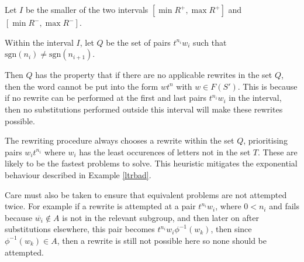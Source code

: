 \documentclass[11pt]{article} %
\theoremstyle{definition}
\theoremstyle{definition}
\theoremstyle{definition}
\newtheorem{lemma}{Lemma}[theorem]
\theoremstyle{definition}
\theoremstyle{definition}
\theoremstyle{definition}
\begin{document}
Let $I$ be the smaller of the two intervals $[\min R^+, \max R^+]$ and
$[\min R^{-}, \max R^-]$.

Within the interval $I$, let $Q$ be the set of pairs $t^{n_i}w_i$ such that
$\text{sgn}(n_i) \ne \text{sgn}(n_{i+1})$.

Then $Q$ has the property that if there are no applicable rewrites
in the set $Q$, then the word cannot be put into the form $wt^n$ with $w \in F(S')$.
This is because if no rewrite can be performed at the first and last pairs $t^{n_i}w_i$
in the interval, then no substitutions performed outside this interval will
make these rewrites possible.

The rewriting procedure always chooses a rewrite within the set $Q$, prioritising
pairs $w_it^{n_i}$ where $w_i$ has the least occurences of letters not in
the set $T$. These are likely to be the fastest problems to solve.
This heuristic mitigates the exponential behaviour described in Example \ref{ltrbad}.

Care must also be taken to ensure that equivalent problems are not attempted twice.
For example if a rewrite is attempted at a pair $t^{n_i}w_i$, where $0 < n_i$
and fails because $\overline{w_i} \notin A$ is not in the relevant subgroup,
and then later on after substitutions elsewhere, this pair becomes
$t^{n_i}w_i\phi^{-1}(w_k)$, then since $\phi^{-1}(w_k) \in A$, then a rewrite
is still not possible here so none should be attempted.








\end{document}
